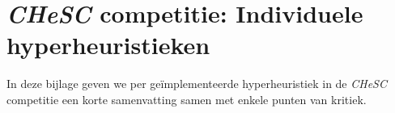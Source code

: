 \chapter{\emph{CHeSC} competitie: Individuele hyperheuristieken}


In deze bijlage geven we per ge\"implementeerde hyperheuristiek in de \emph{CHeSC} competitie een korte samenvatting samen met enkele punten van kritiek.

































